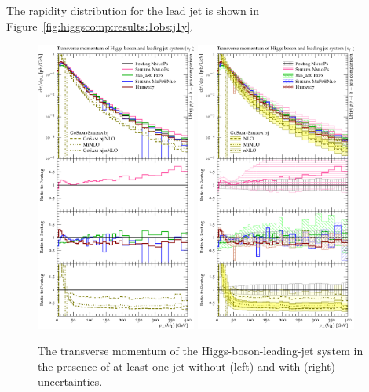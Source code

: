 The rapidity distribution for the lead jet is shown in
Figure~\ref{fig:higgscomp:results:1obs:j1y}.

\begin{figure}[t!]
  \centering
  \includegraphics[width=0.47\textwidth]{figures/hjetscomp_u_Hj_pT_incl.pdf}
  \hfill
  \includegraphics[width=0.47\textwidth]{figures/hjetscomp_Hj_pT_incl.pdf}
  \caption{
    The transverse momentum of the Higgs-boson-leading-jet system in the 
    presence of at least one jet without (left) and with (right) uncertainties.
    \label{fig:higgscomp:results:1obs:hj_pt}
  }
\end{figure}

